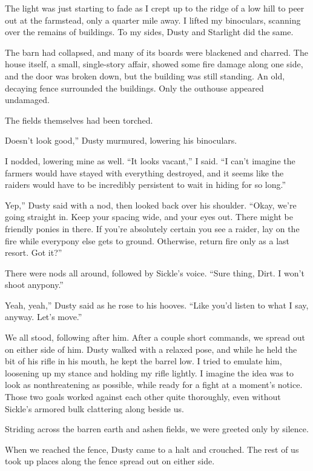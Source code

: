 The light was just starting to fade as I crept up to the ridge of a low hill to peer out at the farmstead, only a quarter mile away. I lifted my binoculars, scanning over the remains of buildings. To my sides, Dusty and Starlight did the same.

The barn had collapsed, and many of its boards were blackened and charred. The house itself, a small, single-story affair, showed some fire damage along one side, and the door was broken down, but the building was still standing. An old, decaying fence surrounded the buildings. Only the outhouse appeared undamaged.

The fields themselves had been torched.

\leavevmode{}Doesn’t look good,” Dusty murmured, lowering his binoculars.

I nodded, lowering mine as well. “It looks vacant,” I said. “I can’t imagine the farmers would have stayed with everything destroyed, and it seems like the raiders would have to be incredibly persistent to wait in hiding for so long.”

\leavevmode{}Yep,” Dusty said with a nod, then looked back over his shoulder. “Okay, we’re going straight in. Keep your spacing wide, and your eyes out. There might be friendly ponies in there. If you’re absolutely certain you see a raider, lay on the fire while everypony else gets to ground. Otherwise, return fire only as a last resort. Got it?”

There were nods all around, followed by Sickle’s voice. “Sure thing, Dirt. I won’t shoot anypony.”

\leavevmode{}Yeah, yeah,” Dusty said as he rose to his hooves. “Like you’d listen to what I say, anyway. Let’s move.”

We all stood, following after him. After a couple short commands, we spread out on either side of him. Dusty walked with a relaxed pose, and while he held the bit of his rifle in his mouth, he kept the barrel low. I tried to emulate him, loosening up my stance and holding my rifle lightly. I imagine the idea was to look as nonthreatening as possible, while ready for a fight at a moment’s notice. Those two goals worked against each other quite thoroughly, even without Sickle’s armored bulk clattering along beside us.

Striding across the barren earth and ashen fields, we were greeted only by silence.

When we reached the fence, Dusty came to a halt and crouched. The rest of us took up places along the fence spread out on either side.

